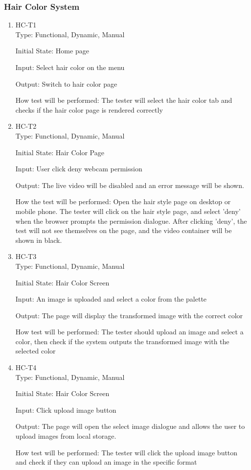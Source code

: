 \documentclass[12pt, titlepage]{article}
\begin{document}
\subsubsection{Hair Color System}
\begin{enumerate}
\item{HC-T1\\}
Type: Functional, Dynamic, Manual
                    
Initial State: Home page
					
Input: Select hair color on the menu
					
Output: Switch to hair color page
					
How test will be performed: The tester will select the hair color tab and checks if the hair color page is rendered correctly

\item{HC-T2\\}
Type: Functional, Dynamic, Manual
					
Initial State: Hair Color Page
					
Input: User click deny webcam permission
					
Output: The live video will be disabled and an error message will be shown.

How the test will be performed: Open the hair style page on desktop or mobile phone. The tester will click on the hair style page, and select 'deny' when the browser prompts the permission dialogue. After clicking 'deny', the test will not see themselves on the page, and the video container will be shown in black.

\item{HC-T3\\}
Type: Functional, Dynamic, Manual
                    
Initial State: Hair Color Screen
					
Input: An image is uploaded and select a color from the palette
					
Output: The page will display the transformed image with the correct color
					
How test will be performed: The tester should upload an image and select a color, then check if the system outputs the transformed image with the selected color

\item{HC-T4\\}
Type: Functional, Dynamic, Manual
                    
Initial State: Hair Color Screen
					
Input: Click upload image button
					
Output: The page will open the select image dialogue and allows the user to upload images from local storage.
					
How test will be performed: The tester will click the upload image button and check if they can upload an image in the specific format
\end{enumerate}
\end{document}

